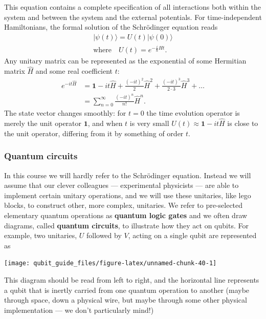 \documentclass[fleqn,a4paper]{article}
\theoremstyle{definition}
\theoremstyle{definition}
\theoremstyle{definition}
\theoremstyle{definition}
\theoremstyle{remark}
\begin{document}
This equation contains a complete specification of all interactions both within the system and between the system and the external potentials.
For time-independent Hamiltonians, the formal solution of the Schrödinger equation reads
\[
  \begin{gathered}
    |\psi(t)\rangle = U(t) |\psi(0)\rangle
  \\\text{where}\quad U(t) = e^{-\frac{i}{\hbar}\hat{H}t}.
  \end{gathered}
\]
Any unitary matrix can be represented as the exponential of some Hermitian matrix \(\hat{H}\) and some real coefficient \(t\):
\[
  \begin{aligned}
    e^{-it\hat{H}}
    &= \mathbf{1}- it\hat{H} + \frac{(-it)^2}{2}\hat{H}^2 + \frac{(-it)^3}{2\cdot3}\hat{H}^3 +\ldots
  \\&= \sum_{n=0}^\infty \frac{(-it)^n}{n!}\hat{H}^n.
  \end{aligned}
\]
The state vector changes smoothly: for \(t=0\) the time evolution operator is merely the unit operator \(\mathbf{1}\), and when \(t\) is very small \(U(t)\approx \mathbf{1}-it\hat{H}\) is close to the unit operator, differing from it by something of order \(t\).

\hypertarget{quantum-circuits}{%
\subsubsection*{Quantum circuits}\label{quantum-circuits}}

In this course we will hardly refer to the Schrödinger equation.
Instead we will assume that our clever colleagues --- experimental physicists --- are able to implement certain unitary operations, and we will use these unitaries, like lego blocks, to construct other, more complex, unitaries.
We refer to pre-selected elementary quantum operations as \textbf{quantum logic gates} and we often draw diagrams, called \textbf{quantum circuits}, to illustrate how they act on qubits.
For example, two unitaries, \(U\) followed by \(V\), acting on a single qubit are represented as

\begin{center}\texttt{[image: qubit\_guide\_files/figure-latex/unnamed-chunk-40-1]} \end{center}

This diagram should be read from left to right, and the horizontal line represents a qubit that is inertly carried from one quantum operation to another (maybe through space, down a physical wire, but maybe through some other physical implementation --- we don't particularly mind!)
\end{document}
